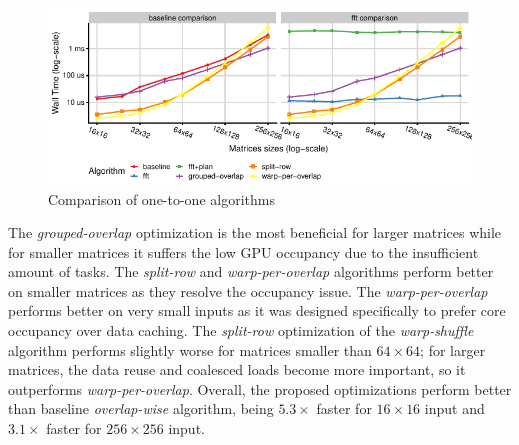 \begin{figure}[ht]
	\centering
	\includegraphics{crosscorr/plots/one-to-one/one-to-one.pdf}
	\caption{Comparison of one-to-one algorithms}
	\label{fig:one-to-one}
\end{figure}

The \emph{grouped-overlap} optimization is the most beneficial for larger matrices while for smaller matrices it suffers the low GPU occupancy due to the insufficient amount of tasks. The \emph{split-row} and \emph{warp-per-overlap} algorithms perform better on smaller matrices as they resolve the occupancy issue. The \emph{warp-per-overlap} performs better on very small inputs as it was designed specifically to prefer core occupancy over data caching. The \emph{split-row} optimization of the \emph{warp-shuffle} algorithm performs slightly worse for matrices smaller than $64\times64$; for larger matrices, the data reuse and coalesced loads become more important, so it outperforms \emph{warp-per-overlap}. Overall, the proposed optimizations perform better than baseline \emph{overlap-wise} algorithm, being $5.3\times$ faster for $16\times16$ input and $3.1\times$ faster for $256\times 256$ input.



